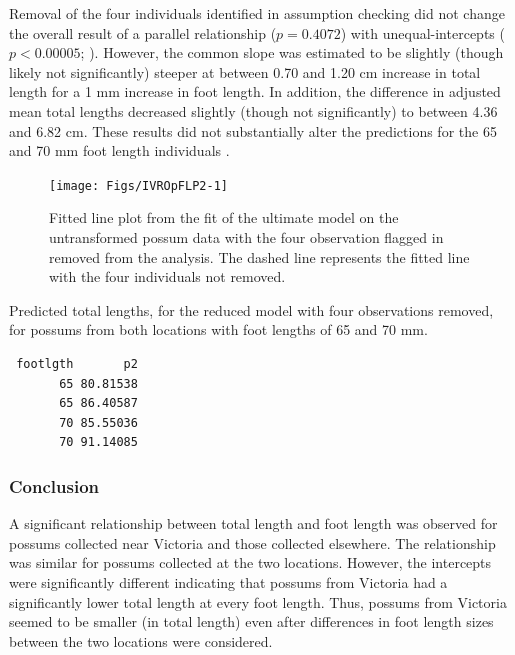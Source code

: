 \documentclass[10pt,openany]{book}\usepackage[]{graphicx}\usepackage[]{color}
\makeatletter
\newenvironment{kframe}{%
 \def\at@end@of@kframe{}%
 \ifinner\ifhmode%
  \def\at@end@of@kframe{\end{minipage}}%
  \begin{minipage}{\columnwidth}%
 \fi\fi%
 \def\FrameCommand##1{\hskip\@totalleftmargin \hskip-\fboxsep
 \colorbox{shadecolor}{##1}\hskip-\fboxsep
     \hskip-\linewidth \hskip-\@totalleftmargin \hskip\columnwidth}%
 \MakeFramed {\advance\hsize-\width
   \@totalleftmargin\z@ \linewidth\hsize
   \@setminipage}}%
 {\par\unskip\endMakeFramed%
 \at@end@of@kframe}
\newenvironment{knitrout}{}{} %
\makeatother
\begin{document}
Removal of the four individuals identified in assumption checking did not change the overall result of a parallel relationship ($p=0.4072$) with unequal-intercepts ($p<0.00005$; ).  However, the common slope was estimated to be slightly (though likely not significantly) steeper at between 0.70 and 1.20 cm increase in total length for a 1 mm increase in foot length.  In addition, the difference in adjusted mean total lengths decreased slightly (though not significantly) to between 4.36 and 6.82 cm.  These results did not substantially alter the predictions for the 65 and 70 mm foot length individuals .

\begin{knitrout}
\color{fgcolor}\begin{figure}[h]

{\centering \texttt{[image: Figs/IVROpFLP2-1]} 

}

\caption[Fitted line plot from the fit of the ultimate model on the untransformed possum data with the four observation removed from the analysis.]{Fitted line plot from the fit of the ultimate model on the untransformed possum data with the four observation flagged in  removed from the analysis.  The dashed line represents the fitted line with the four individuals not removed.}\label{fig:IVROpFLP2}
\end{figure}


\end{knitrout}

\begin{table}[h]
  \centering
  \caption{Predicted total lengths, for the reduced model with four observations removed, for possums from both locations with foot lengths of 65 and 70 mm.}\label{tab:IVROpPreds2}
\begin{knitrout}
\color{fgcolor}\begin{kframe}
\begin{verbatim}
 footlgth       p2
       65 80.81538
       65 86.40587
       70 85.55036
       70 91.14085
\end{verbatim}
\end{kframe}
\end{knitrout}
\end{table}

\subsubsection*{Conclusion}
A significant relationship between total length and foot length was observed for possums collected near Victoria and those collected elsewhere.  The relationship was similar for possums collected at the two locations.  However, the intercepts were significantly different indicating that possums from Victoria had a significantly lower total length at every foot length.  Thus, possums from Victoria seemed to be smaller (in total length) even after differences in foot length sizes between the two locations were considered.
\end{document}
